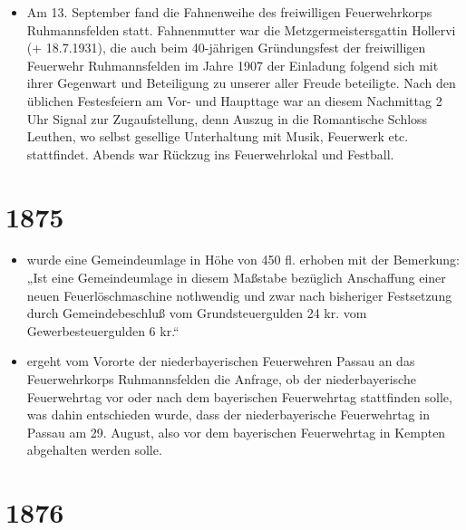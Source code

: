 \documentclass[12pt,a4paper]{book}
\begin{document}
\begin{itemize}
\item Am 13. September fand die Fahnenweihe des freiwilligen Feuerwehrkorps
Ruhmannsfelden statt. Fahnenmutter war die Metzgermeistersgattin Hollervi (+
18.7.1931), die auch beim 40-jährigen Gründungsfest der freiwilligen Feuerwehr
Ruhmannsfelden im Jahre 1907 der Einladung folgend sich mit ihrer Gegenwart und
Beteiligung zu unserer aller Freude beteiligte. Nach den üblichen Festesfeiern
am Vor- und Haupttage war an diesem Nachmittag 2 Uhr Signal zur Zugaufstellung,
denn Auszug in die Romantische Schloss Leuthen, wo selbst gesellige Unterhaltung
mit Musik, Feuerwerk etc. stattfindet. Abends war Rückzug ins Feuerwehrlokal und
Festball.
\end{itemize}

\section*{1875}

\begin{itemize}
\item wurde eine Gemeindeumlage in Höhe von 450 fl. erhoben mit der Bemerkung:
„Ist eine Gemeindeumlage in diesem Maßstabe bezüglich Anschaffung einer neuen
Feuerlöschmaschine nothwendig und zwar nach bisheriger Festsetzung durch
Gemeindebeschluß vom Grundsteuergulden 24 kr. vom Gewerbesteuergulden 6 kr.“

\item ergeht vom Vororte der niederbayerischen Feuerwehren Passau an das
Feuerwehrkorps Ruhmannsfelden die Anfrage, ob der niederbayerische Feuerwehrtag
vor oder nach dem bayerischen Feuerwehrtag stattfinden solle, was dahin
entschieden wurde, dass der niederbayerische Feuerwehrtag in Passau am 29.
August, also vor dem bayerischen Feuerwehrtag in Kempten abgehalten werden
solle.
\end{itemize}

\section*{1876}
\end{document}
